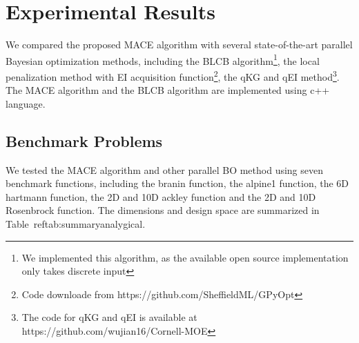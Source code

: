 \section{Experimental Results}


We compared the proposed MACE algorithm with several state-of-the-art parallel Bayesian optimization methods, including the BLCB algorithm\footnote{We implemented this algorithm, as the available open source implementation only takes discrete input}, the local penalization method with EI acquisition function\footnote{Code downloade from https://github.com/SheffieldML/GPyOpt}, the qKG and qEI method\footnote{The code for qKG and qEI is available at https://github.com/wujian16/Cornell-MOE}. The MACE algorithm and the BLCB algorithm are implemented using c++ language. 

\subsection{Benchmark Problems}

We tested the MACE algorithm and other parallel BO method using seven benchmark
functions, including the branin function, the alpine1 function, the 6D hartmann
function, the 2D and 10D ackley function and the 2D and 10D Rosenbrock
function. The dimensions and design space are summarized in Table~ref{tab:summaryanalygical}.



